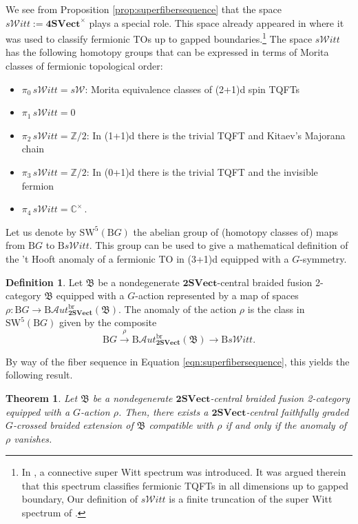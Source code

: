 \documentclass[11pt,reqno]{amsart}
\newcommand{\Z}{\mathbb{Z}}
\newcommand{\sWitt}{s\mathscr{W}itt}
\newcommand{\sAut}{\mathscr{A}ut}
\newcommand{\rB}{\mathrm{B}}
\numberwithin{equation}{section}
\theoremstyle{plain}
\newtheorem{thm}[equation]{Theorem}
\theoremstyle{definition}
\newtheorem{defn}[equation]{Definition}
\begin{document}
We see from Proposition \ref{prop:superfibersequence} that the space $\sWitt:=\mathbf{4SVect}^{\times}$ plays a special role. This space already appeared in \cite[Section 3.3]{JF2} where it was used to classify fermionic TOs up to gapped boundaries.\footnote{In \cite[Section 3.3]{JF2}, a connective super Witt spectrum was introduced. It was argued therein that this spectrum classifies fermionic TQFTs in all dimensions up to gapped boundary, Our definition of $\sWitt$ is a finite truncation of the super Witt spectrum of \cite{JF2}.}
The space $\sWitt$ has the following homotopy groups that can be expressed in terms of Morita classes of fermionic topological order:

\begin{itemize}
    \item $\pi_0\, \sWitt = s\mathcal{W}$: Morita equivalence classes of (2+1)d spin TQFTs
    \item $\pi_1\,\sWitt =0$
     \item $\pi_2 \, \sWitt=\Z/2$: In (1+1)d there is the trivial TQFT and Kitaev's Majorana chain
    \item $\pi_3 \, \sWitt=\Z/2$: In (0+1)d there is the trivial TQFT and the invisible fermion
     \item $\pi_4\, \sWitt =\mathbb{C}^\times$\,.
\end{itemize}

Let us denote by $\mathrm{SW}^5(\rB G)$ the abelian group of (homotopy classes of) maps from $\rB G$ to $\rB \sWitt$. This group can be used to give a mathematical definition of the 't Hooft anomaly of a fermionic TO in (3+1)d equipped with a $G$-symmetry.

\begin{defn}
Let $\mathfrak{B}$ be a nondegenerate $\mathbf{2SVect}$-central braided fusion 2-category $\mathfrak{B}$ equipped with a $G$-action represented by a map of spaces $\rho:\rB G\rightarrow\rB\sAut^{\mathrm{br}}_{\mathbf{2SVect}}(\mathfrak{B})$. The anomaly of the action $\rho$ is the class in $\mathrm{SW}^5(\rB G)$ given by the composite $$\rB G\xrightarrow{\rho} \rB\sAut^{\mathrm{br}}_{\mathbf{2SVect}}(\mathfrak{B})\rightarrow \rB \sWitt.$$
\end{defn}

By way of the fiber sequence in Equation \eqref{eqn:superfibersequence}, this yields the following result.

\begin{thm}\label{prop:sWittAnomaly}
Let $\mathfrak{B}$ be a nondegenerate $\mathbf{2SVect}$-central braided fusion 2-category equipped with a $G$-action $\rho$. Then, there exists a $\mathbf{2SVect}$-central faithfully graded $G$-crossed braided extension of $\mathfrak{B}$ compatible with $\rho$ if and only if the anomaly of $\rho$ vanishes.
\end{thm}
\end{document}

